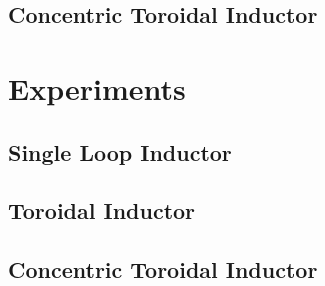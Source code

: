 \documentclass{article}
\numberwithin{equation}{subsection}
\begin{document}
\subsection{Concentric Toroidal Inductor}

\section{Experiments}

\subsection{Single Loop Inductor}

\subsection{Toroidal Inductor}

\subsection{Concentric Toroidal Inductor}
\end{document}
